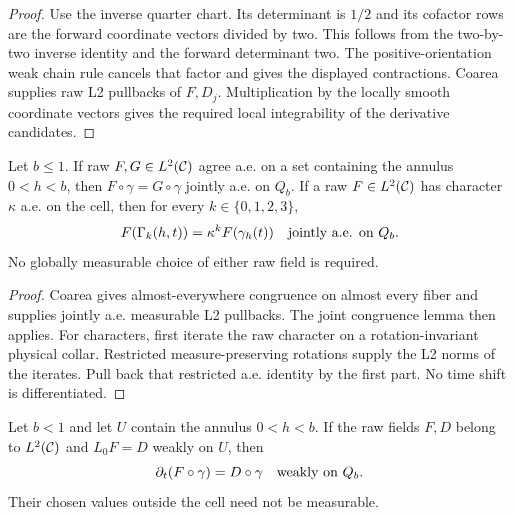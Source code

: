 \begin{proof}
\leanok
Use the inverse quarter chart. Its determinant is $1/2$ and its cofactor
rows are the forward coordinate vectors divided by two.
This follows from the two-by-two inverse identity and the forward determinant two.
The positive-orientation weak chain rule cancels that factor and gives the
displayed contractions. Coarea supplies raw L2 pullbacks of $F,D_j$.
Multiplication by the locally smooth coordinate vectors gives the required
local integrability of the derivative candidates.
\end{proof}

\begin{lemma}
\label{lem:quarter-raw-congruence}
\leanok
Let $b\le1$. If raw $F,G\in L^2(\mathcal{C})$ agree a.e. on a set containing
the annulus $0<h<b$, then $F\circ\gamma=G\circ\gamma$ jointly a.e. on $Q_b$.
If a raw $F\in L^2(\mathcal{C})$ has character $\kappa$ a.e. on the cell, then
for every $k\in\{0,1,2,3\}$,
\[
 F(\Gamma_k(h,t))=\kappa^k F(\gamma_h(t))
 \quad\hbox{jointly a.e. on }Q_b .
\]
No globally measurable choice of either raw field is required.
\end{lemma}

\begin{proof}
\leanok
Coarea gives almost-everywhere congruence on almost every fiber and supplies
jointly a.e. measurable L2 pullbacks. The joint congruence lemma then applies.
For characters, first iterate the raw character on a rotation-invariant
physical collar. Restricted measure-preserving rotations supply the L2 norms
of the iterates. Pull back that restricted a.e. identity by the first part.
No time shift is differentiated.
\end{proof}

\begin{lemma}
\label{lem:quarter-time-raw}
\leanok
Let $b<1$ and let $U$ contain the annulus $0<h<b$.
If the raw fields $F,D$ belong to $L^2(\mathcal{C})$ and $L_0F=D$ weakly on $U$,
then
\[
 \partial_t(F\circ\gamma)=D\circ\gamma
 \quad\hbox{weakly on }Q_b .
\]
Their chosen values outside the cell need not be measurable.
\end{lemma}

